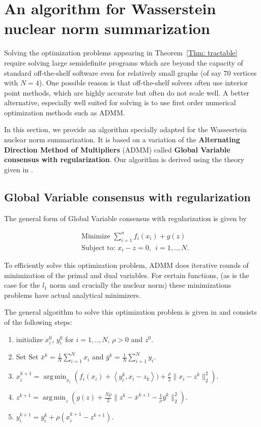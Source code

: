 \documentclass[12pt]{amsart}
\theoremstyle{remark}
\DeclareMathOperator*{\argmin}{arg\,min}
\begin{document}
\section{An algorithm for Wasserstein nuclear norm summarization }


Solving the optimization problems appearing in Theorem~\ref{Thm: tractable} require solving large semidefinite programs which are beyond the  capacity of standard off-the-shelf software even for relatively small graphs (of say $70$ vertices with $N=4$). One possible reason is that off-the-shelf solvers often use interior point methods, which are highly accurate but often do not scale well. A better alternative, especially well suited for solving is to use first order numerical optimization methods such as ADMM.

In this section, we provide an algorithm specially adapted for the Wassesrtein nuclear norm summarization. It is based on a variation of the \textbf{Alternating Direction Method of Multipliers} (ADMM) called \textbf{Global Variable consensus with regularization}. Our algorithm is derived using the theory given in \cite{boyd2011distributed}.


\subsection{Global Variable consensus with regularization}


The general form of Global Variable consensus with regularization is given by 

\begin{equation}\label{GVC}
\begin{aligned}
& \text{Minimize   } \sum_{i=1}^n f_i(x_i)+g(z) \\
&\text{Subject to: } x_i-z = 0, \ \ i=1,..,N. 
\end{aligned}
\end{equation}



To efficiently solve this optimization problem, ADMM does iterative rounds of minimization of the primal and dual variables. For certain functions, (as is the case for the $l_1$ norm and crucially the nuclear norm) these minimizations problems have actual analytical minimizers. 


The general algorithm to solve this optimization problem is given in \cite{boyd2011distributed} and consists of the following steps:

\begin{enumerate}
\item initialize $x^0_i$, $y^0_i$ for $i=1,..,N$, $\rho>0$ and $z^0$.
\item Set $ \text{Set } \bar{x}^{k} = \frac{1}{N}\sum_{i=1}^N x_i $ and $\bar{y}^{k} = \frac{1}{N}\sum_{i=1}^N y_i $.
\item $x_i^{k+1} = \argmin_{x_i} \left( f_i(x_i) + \left \langle y_i^k,x_i-z_k \right \rangle) +\frac{\rho}{2}\|x_i-z^k\|_2^2\right ).$
\item $z^{k+1} = \argmin_z \left (g(z)+\frac{N\rho}{2}\|z^k-\bar{x}^{k+1} -\frac{1}{\rho}\bar{y}^k \|_2^2 \right ).$
\item $y_i^{k+1} = y_i^k + \rho(x_i^{k+1}-z^{k+1}).$
\end{enumerate}
\end{document}
